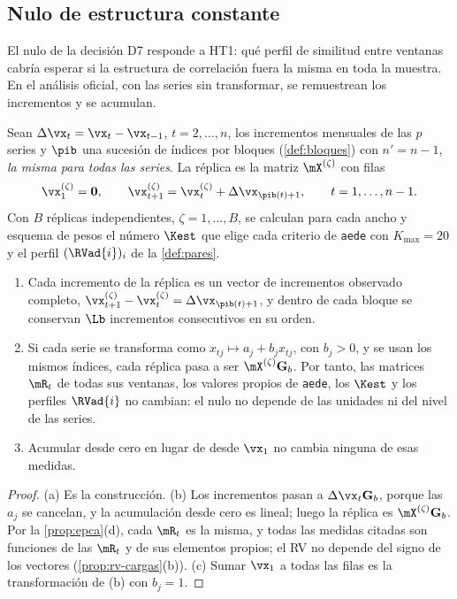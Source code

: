 \subsection{Nulo de estructura constante}
\label{sec:nulo-estructura}

El nulo de la decisión D7 responde a HT1: qué perfil de similitud entre ventanas cabría esperar si
la estructura de correlación fuera la misma en toda la muestra. En el análisis oficial, con las
series sin transformar, se remuestrean los incrementos y se acumulan.

\begin{definicion}\label{def:nulo-estructura}
Sean $\Delta\vx_{t}=\vx_{t}-\vx_{t-1}$, $t=2,\dots,n$, los incrementos mensuales de las $p$ series y
$\pib$ una sucesión de índices por bloques (\cref{def:bloques}) con $n'=n-1$, \emph{la misma para
todas las series}. La réplica es la matriz $\mX^{(\zeta)}$ con filas
\[
  \vx^{(\zeta)}_1=\mathbf{0},\qquad \vx^{(\zeta)}_{t+1}=\vx^{(\zeta)}_t+\Delta\vx_{\pib(t)+1},\qquad
  t=1,\dots,n-1 .
\]
Con $B$ réplicas independientes, $\zeta=1,\dots,B$, se calculan para cada ancho y esquema de pesos
el número $\Kest$ que elige cada criterio de \texttt{aede} con $K_{\max}=20$ y el perfil
$(\RVad{i})_i$ de la \cref{def:pares}.
\end{definicion}

\begin{proposicion}\label{prop:nulo-estructura}
\begin{enumerate}[label=(\alph*)]
  \item Cada incremento de la réplica es un vector de incrementos observado completo,
    $\vx^{(\zeta)}_{t+1}-\vx^{(\zeta)}_t=\Delta\vx_{\pib(t)+1}$, y dentro de cada bloque se conservan
    $\Lb$ incrementos consecutivos en su orden.
  \item Si cada serie se transforma como $x_{tj}\mapsto a_j+b_jx_{tj}$, con $b_j>0$, y se usan los
    mismos índices, cada réplica pasa a ser $\mX^{(\zeta)}\mathbf{G}_b$. Por tanto, las matrices
    $\mR_t$ de todas sus ventanas, los valores propios de \texttt{aede}, los $\Kest$ y los perfiles
    $\RVad{i}$ no cambian: el nulo no depende de las unidades ni del nivel de las series.
  \item Acumular desde cero en lugar de desde $\vx_1$ no cambia ninguna de esas medidas.
\end{enumerate}
\end{proposicion}

\begin{proof}
(a) Es la construcción. (b) Los incrementos pasan a $\Delta\vx_t\mathbf{G}_b$, porque las $a_j$ se
cancelan, y la acumulación desde cero es lineal; luego la réplica es $\mX^{(\zeta)}\mathbf{G}_b$.
Por la \cref{prop:epca}(d), cada $\mR_t$ es la misma, y todas las medidas citadas son funciones de
las $\mR_t$ y de sus elementos propios; el RV no depende del signo de los vectores
(\cref{prop:rv-cargas}(b)). (c) Sumar $\vx_1$ a todas las filas es la transformación de (b) con
$b_j=1$.
\end{proof}

